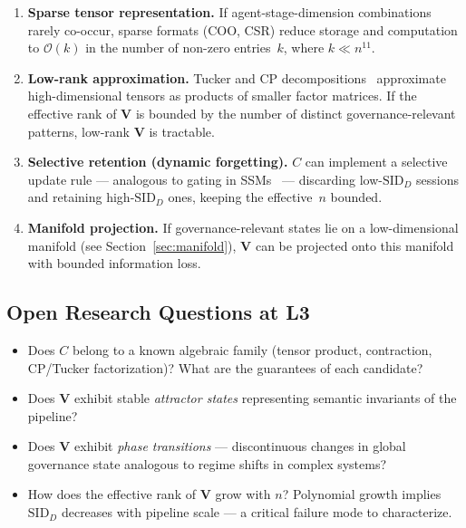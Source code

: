 \documentclass[11pt]{article}
\theoremstyle{definition}
\theoremstyle{remark}
\begin{document}
\begin{enumerate}[leftmargin=2em]
  \item \textbf{Sparse tensor representation.} If agent-stage-di\-men\-sion
    combinations rarely co-occur, sparse formats (COO, CSR) reduce
    storage and computation to $\mathcal{O}(k)$ in the number of
    non-zero entries~$k$, where $k \ll n^{11}$.

  \item \textbf{Low-rank approximation.} Tucker and CP
    decompositions~\cite{kolda2009tensor} approximate high-dimensional
    tensors as products of smaller factor matrices. If the effective
    rank of $\mathbf{V}$ is bounded by the number of distinct
    governance-relevant patterns, low-rank $\mathbf{V}$ is tractable.

  \item \textbf{Selective retention (dynamic forgetting).} $C$ can
    implement a selective update rule --- analogous to gating in
    SSMs~\cite{gu2023mamba} --- discarding low-$\text{SID}_D$
    sessions and retaining high-$\text{SID}_D$ ones, keeping the
    effective~$n$ bounded.

  \item \textbf{Manifold projection.} If governance-relevant states
    lie on a low-dimensional manifold (see Section~\ref{sec:manifold}),
    $\mathbf{V}$ can be projected onto this manifold with bounded
    information loss.
\end{enumerate}

\subsection{Open Research Questions at L3}

\begin{itemize}[leftmargin=1.5em]
  \item Does $C$ belong to a known algebraic family (tensor product,
    contraction, CP/Tucker factorization)? What are the
    guarantees of each candidate?
  \item Does $\mathbf{V}$ exhibit stable \emph{attractor states}
    representing semantic invariants of the pipeline?
  \item Does $\mathbf{V}$ exhibit \emph{phase transitions} --- discontinuous
    changes in global governance state analogous to regime shifts in
    complex systems?
  \item How does the effective rank of $\mathbf{V}$ grow with $n$?
    Polynomial growth implies $\text{SID}_D$ decreases with pipeline
    scale --- a critical failure mode to characterize.
\end{itemize}
\end{document}
